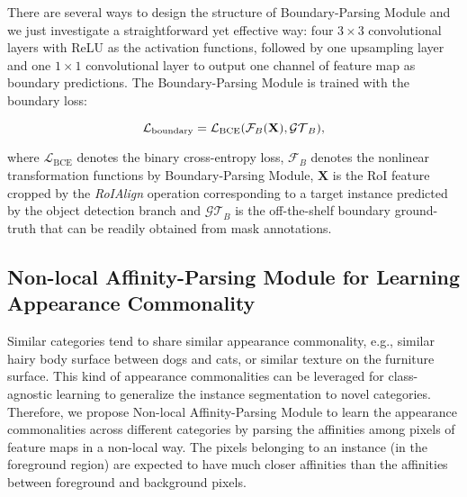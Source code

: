 \documentclass[runningheads]{llncs}
\begin{document}
There are several ways to design the structure of Boundary-Parsing Module and we just investigate a straightforward yet effective way: four $3\times 3$ convolutional layers with ReLU as the activation functions, followed by one upsampling layer and one $1\times 1$ convolutional layer to output one channel of feature map as boundary predictions. The Boundary-Parsing Module is trained with the boundary loss:

\vspace{-0.1in}
\begin{small}
\begin{equation}
\vspace{-3mm}
    \mathcal{L}_{\text{boundary}} = \mathcal{L}_{\text{BCE}}(\mathcal{F}_{B}(\mathbf{X}), \mathcal{GT}_{B}),
\end{equation}
\end{small}

\vspace{-2mm}\noindent
where $\mathcal{L}_{\text{BCE}}$ denotes the binary cross-entropy loss, $\mathcal{F}_{B}$ denotes the nonlinear transformation functions by Boundary-Parsing Module, $\mathbf{X}$ is the RoI feature cropped by the \emph{RoIAlign} operation corresponding to a target instance predicted by the object detection branch and $\mathcal{GT}_{B}$ is the off-the-shelf boundary ground-truth that can be readily obtained from mask annotations.

\vspace{-0.1in}
\subsection{Non-local Affinity-Parsing Module for Learning Appearance Commonality}
\label{sec:affinity}
Similar categories tend to share similar appearance commonality, e.g., similar hairy body surface between dogs and cats, or similar texture on the furniture surface.
This kind of appearance commonalities can be leveraged for class-agnostic learning to generalize the instance segmentation to novel categories. Therefore, we propose Non-local Affinity-Parsing Module to learn the appearance commonalities across different categories by parsing the affinities among pixels of feature maps in a non-local way. The pixels belonging to an instance (in the foreground region) are expected to have much closer affinities than the affinities between foreground and background pixels.
\end{document}
